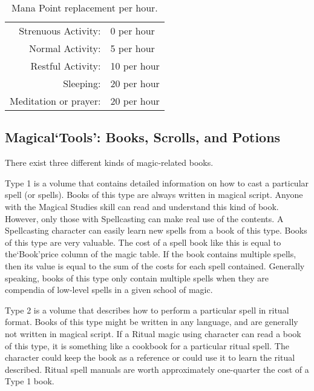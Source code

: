 \documentclass[twoside]{book}
\begin{document}
\begin{table}[!htb]
  \begin{center}

  \begin{tabular}{|r|l|}
  \hline
\textscbf{} &\textscbf{} \\
  \hline
  \hline
      Strenuous Activity:&0 per hour\\
\hline
Normal Activity:&5 per hour\\
\hline
Restful Activity:&10 per hour\\
\hline
Sleeping:&20 per hour\\
\hline
Meditation or prayer:&20 per hour\\
\hline

  \end{tabular}
  
\caption{Mana Point replacement per hour.}
  
  \end{center}
\end{table}
  
    

\subsection{Magical`Tools': Books, Scrolls, and Potions}
    
    {  
    There exist three different kinds of magic-related books.
    }
  
    {  
    Type 1 is a volume that contains detailed information on how to cast a particular spell (or spells). Books of this type are always written in magical script. Anyone with the Magical Studies skill can read and understand this kind of book. However, only those with Spellcasting can make real use of the contents. A Spellcasting character can easily learn new spells from a book of this type. Books of this type are very valuable. The cost of a spell book like this is equal to the`Book'price column of the magic table. If the book contains multiple spells, then its value is equal to the sum of the costs for each spell contained. Generally speaking, books of this type only contain multiple spells when they are compendia of low-level spells in a given school of magic.
    }
  
    {  
    Type 2 is a volume that describes how to perform a particular spell in ritual format. Books of this type might be written in any language, and are generally not written in magical script. If a Ritual magic using character can read a book of this type, it is something like a cookbook for a particular ritual spell. The character could keep the book as a reference or could use it to learn the ritual described. Ritual spell manuals are worth approximately one-quarter the cost of a Type 1 book.
    }
  
\end{document}
